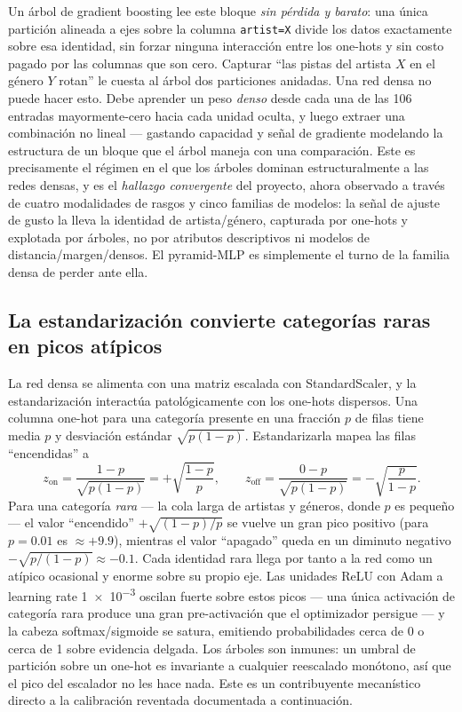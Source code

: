 \documentclass[11pt]{article}
\begin{document}
Un árbol de gradient boosting lee este bloque \emph{sin pérdida y barato}: una
única partición alineada a ejes sobre la columna \texttt{artist=X} divide los
datos exactamente sobre esa identidad, sin forzar ninguna interacción entre los
one-hots y sin costo pagado por las columnas que son cero. Capturar ``las pistas
del artista $X$ en el género $Y$ rotan'' le cuesta al árbol dos particiones
anidadas. Una red densa no puede hacer esto. Debe aprender un peso \emph{denso}
desde cada una de las 106 entradas mayormente-cero hacia cada unidad oculta, y
luego extraer una combinación no lineal --- gastando capacidad y señal de
gradiente modelando la estructura de un bloque que el árbol maneja con una
comparación. Este es precisamente el régimen en el que los árboles dominan
estructuralmente a las redes densas, y es el \emph{hallazgo convergente} del
proyecto, ahora observado a través de cuatro modalidades de rasgos y cinco
familias de modelos: la señal de ajuste de gusto la lleva la identidad de
artista/género, capturada por one-hots y explotada por árboles, no por atributos
descriptivos ni modelos de distancia/margen/densos. El pyramid-MLP es simplemente
el turno de la familia densa de perder ante ella.

\subsection{La estandarización convierte categorías raras en picos atípicos}
\label{sec:anns-scaler}
La red densa se alimenta con una matriz escalada con StandardScaler, y la
estandarización interactúa patológicamente con los one-hots dispersos. Una
columna one-hot para una categoría presente en una fracción $p$ de filas tiene
media $p$ y desviación estándar $\sqrt{p(1-p)}$. Estandarizarla mapea las filas
``encendidas'' a
\[
  z_{\text{on}} = \frac{1-p}{\sqrt{p(1-p)}} = +\sqrt{\frac{1-p}{p}},
  \qquad
  z_{\text{off}} = \frac{0-p}{\sqrt{p(1-p)}} = -\sqrt{\frac{p}{1-p}}.
\]
Para una categoría \emph{rara} --- la cola larga de artistas y géneros, donde $p$
es pequeño --- el valor ``encendido'' $+\sqrt{(1-p)/p}$ se vuelve un gran pico
positivo (para $p=0.01$ es $\approx +9.9$), mientras el valor ``apagado'' queda
en un diminuto negativo $-\sqrt{p/(1-p)}\approx -0.1$. Cada identidad rara llega
por tanto a la red como un atípico ocasional y enorme sobre su propio eje. Las
unidades ReLU con Adam a learning rate \num{1e-3} oscilan fuerte sobre estos picos
--- una única activación de categoría rara produce una gran pre-activación que el
optimizador persigue --- y la cabeza softmax/sigmoide se satura, emitiendo
probabilidades cerca de 0 o cerca de 1 sobre evidencia delgada. Los árboles son
inmunes: un umbral de partición sobre un one-hot es invariante a cualquier
reescalado monótono, así que el pico del escalador no les hace nada. Este es un
contribuyente mecanístico directo a la calibración reventada documentada a
continuación.
\end{document}

